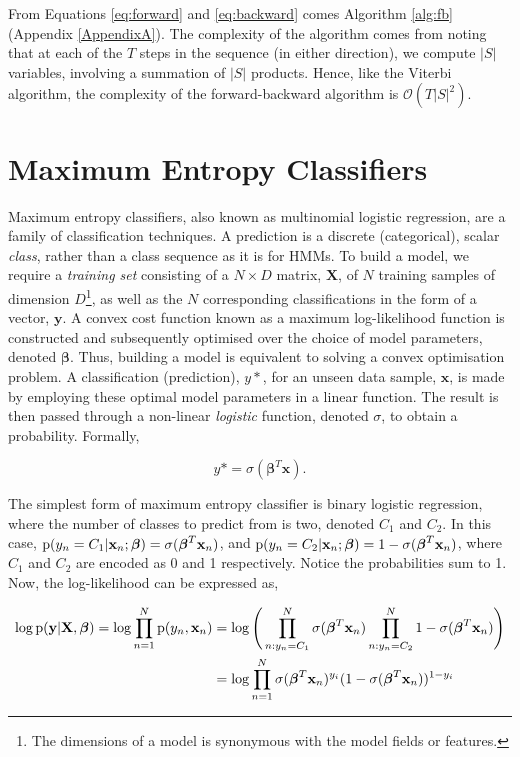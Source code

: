 From Equations \ref{eq:forward} and \ref{eq:backward} comes Algorithm \ref{alg:fb} (Appendix \ref{AppendixA}). The complexity of the algorithm comes from noting that at each of the $T$ steps in the sequence (in either direction), we compute $|S|$ variables, involving a summation of $|S|$ products. Hence, like the Viterbi algorithm, the complexity of the forward-backward algorithm is $\mathcal{O}(T|S|^2)$.

\section{Maximum Entropy Classifiers}

Maximum entropy classifiers, also known as multinomial logistic regression, are a family of classification techniques.  A prediction is a discrete (categorical), scalar \emph{class}, rather than a class sequence as it is for HMMs. To build a model, we require a \emph{training set} consisting of a $N \times D$ matrix, $\mathbf{X}$, of $N$ training samples of dimension $D$\footnote{The dimensions of a model is synonymous with the model fields or features.}, as well as the $N$ corresponding classifications in the form of a vector, $\mathbf{y}$. A convex cost function known as a maximum log-likelihood function is constructed and subsequently optimised over the choice of model parameters, denoted $\boldsymbol\beta$. Thus, building a model is equivalent to solving a convex optimisation problem. A classification (prediction), $y*$, for an unseen data sample, $\mathbf{x}$, is made by employing these optimal model parameters in a linear function. The result is then passed through a non-linear \emph{logistic} function, denoted $\sigma$, to obtain a probability. Formally,

\begin{equation}
y* = \sigma(\boldsymbol\beta^T\mathbf{x}).
\label{eq:logisticprediction}
\end{equation}

The simplest form of maximum entropy classifier is binary logistic regression, where the number of classes to predict from is two, denoted $C_1$ and $C_2$. In this case, $\text{p}(y_n = C_1|\mathbf{x}_n;\boldsymbol\beta) = \sigma(\boldsymbol\beta^T\mathbf{x}_n)$, and $\text{p}(y_n = C_2|\mathbf{x}_n;\boldsymbol\beta) = 1 - \sigma(\boldsymbol\beta^T\mathbf{x}_n)$, where $C_1$ and $C_2$ are encoded as 0 and 1 respectively. Notice the probabilities sum to 1. Now, the log-likelihood can be expressed as,

\begin{equation}
\begin{aligned}
\log\text{p}(\mathbf{y}|\mathbf{X}, \boldsymbol\beta) = \log\prod_{n=1}^N \text{p}(y_n, \mathbf{x}_n)
&= \log\Bigg(\prod_{n:y_n = C_1}^N \sigma(\boldsymbol\beta^T\mathbf{x}_n) \prod_{n:y_n = C_2}^N 1 - \sigma(\boldsymbol\beta^T\mathbf{x}_n)\Bigg) \\
&=  \log\prod_{n = 1}^N \sigma(\boldsymbol\beta^T\mathbf{x}_n)^{y_i}(1 - \sigma(\boldsymbol\beta^T\mathbf{x}_n))^{1 - y_i}
\end{aligned}
\label{eq:logistic2}
\end{equation}


